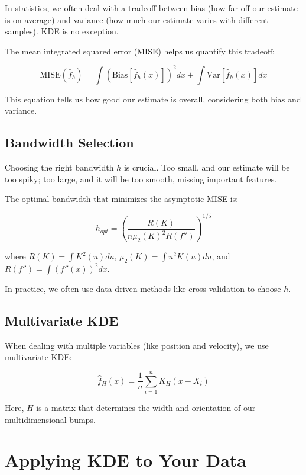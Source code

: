\documentclass[conference]{IEEEtran}
\begin{document}
In statistics, we often deal with a tradeoff between bias (how far off our estimate is on average) and variance (how much our estimate varies with different samples). KDE is no exception.

The mean integrated squared error (MISE) helps us quantify this tradeoff:

\begin{equation}
    \text{MISE}(\hat{f}_h) = \int (\text{Bias}[\hat{f}_h(x)])^2 dx + \int \text{Var}[\hat{f}_h(x)] dx
\end{equation}

This equation tells us how good our estimate is overall, considering both bias and variance.

\subsection{Bandwidth Selection}

Choosing the right bandwidth $h$ is crucial. Too small, and our estimate will be too spiky; too large, and it will be too smooth, missing important features.

The optimal bandwidth that minimizes the asymptotic MISE is:

\begin{equation}
    h_{opt} = \left(\frac{R(K)}{n \mu_2(K)^2 R(f'')}\right)^{1/5}
\end{equation}

where $R(K) = \int K^2(u) du$, $\mu_2(K) = \int u^2 K(u) du$, and $R(f'') = \int (f''(x))^2 dx$.

In practice, we often use data-driven methods like cross-validation to choose $h$.

\subsection{Multivariate KDE}

When dealing with multiple variables (like position and velocity), we use multivariate KDE:

\begin{equation}
    \hat{f}_H(x) = \frac{1}{n} \sum_{i=1}^n K_H(x - X_i)
\end{equation}

Here, $H$ is a matrix that determines the width and orientation of our multidimensional bumps.

\section{Applying KDE to Your Data}
\end{document}
